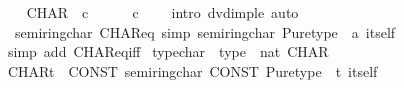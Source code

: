 \begin{isabellebody}
\ \ \isamarkupfalse%
\ {\isachardoublequoteopen}CHAR\ {\isasymle}\ c{\isachardoublequoteclose}\isanewline
\ \ \ \ \isamarkupfalse%
\ {\isacartoucheopen}c\ {\isachargreater}{\kern0pt}\ {}{\isacartoucheclose}\ \isamarkupfalse%
\ {\isacharparenleft}{\kern0pt}intro\ dvd{\isacharunderscore}{\kern0pt}imp{\isacharunderscore}{\kern0pt}le{\isacharparenright}{\kern0pt}\ auto\isanewline
{}\isamarkupfalse%
%
\endisatagproof
{\isafoldproof}%
%
\isadelimproof
\isanewline
%
\endisadelimproof
\isanewline
{}\isamarkupfalse%
\isanewline
{}\isamarkupfalse%
\isanewline
\isanewline
{}\isamarkupfalse%
\ {\isacharparenleft}{\kern0pt}\ semiring{\isacharunderscore}{\kern0pt}char{\isacharunderscore}{\kern0pt}{}{\isacharparenright}{\kern0pt}\ CHAR{\isacharunderscore}{\kern0pt}eq{\isacharunderscore}{\kern0pt}{}\ {\isacharbrackleft}{\kern0pt}simp{\isacharbrackright}{\kern0pt}{\isacharcolon}{\kern0pt}\ {\isachardoublequoteopen}semiring{\isacharunderscore}{\kern0pt}char\ {\isacharparenleft}{\kern0pt}Pure{\isachardot}{\kern0pt}type\ {\isacharcolon}{\kern0pt}{\isacharcolon}{\kern0pt}\ {\isacharprime}{\kern0pt}a\ itself{\isacharparenright}{\kern0pt}\ {\isacharequal}{\kern0pt}\ {}{\isachardoublequoteclose}\isanewline
%
\isadelimproof
\ \ %
\endisadelimproof
%
\isatagproof
{}\isamarkupfalse%
\ {\isacharparenleft}{\kern0pt}simp\ add{\isacharcolon}{\kern0pt}\ CHAR{\isacharunderscore}{\kern0pt}eq{}{\isacharunderscore}{\kern0pt}iff{\isacharparenright}{\kern0pt}%
\endisatagproof
{\isafoldproof}%
%
\isadelimproof
\isanewline
%
\endisadelimproof
\isanewline
\isanewline
\isanewline
\isanewline
{}\isamarkupfalse%
\ {\isachardoublequoteopen}{\isacharunderscore}{\kern0pt}type{\isacharunderscore}{\kern0pt}char{\isachardoublequoteclose}\ {\isacharcolon}{\kern0pt}{\isacharcolon}{\kern0pt}\ {\isachardoublequoteopen}type\ {\isacharequal}{\kern0pt}{\isachargreater}{\kern0pt}\ nat{\isachardoublequoteclose}\ {\isacharparenleft}{\kern0pt}{\isachardoublequoteopen}{\isacharparenleft}{\kern0pt}{}CHAR{\isacharslash}{\kern0pt}{\isacharparenleft}{\kern0pt}{}{\isacharprime}{\kern0pt}{\isacharparenleft}{\kern0pt}{\isacharunderscore}{\kern0pt}{\isacharprime}{\kern0pt}{\isacharparenright}{\kern0pt}{\isacharparenright}{\kern0pt}{\isacharparenright}{\kern0pt}{\isachardoublequoteclose}{\isacharparenright}{\kern0pt}\isanewline
\isanewline
{}\isamarkupfalse%
\ {\isachardoublequoteopen}CHAR{\isacharparenleft}{\kern0pt}{\isacharprime}{\kern0pt}t{\isacharparenright}{\kern0pt}{\isachardoublequoteclose}\ {\isacharequal}{\kern0pt}{\isachargreater}{\kern0pt}\ {\isachardoublequoteopen}CONST\ semiring{\isacharunderscore}{\kern0pt}char\ {\isacharparenleft}{\kern0pt}CONST\ Pure{\isachardot}{\kern0pt}type\ {\isacharcolon}{\kern0pt}{\isacharcolon}{\kern0pt}\ {\isacharprime}{\kern0pt}t\ itself{\isacharparenright}{\kern0pt}{\isachardoublequoteclose}\isanewline

\end{isabellebody}
